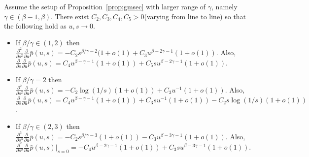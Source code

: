 \documentclass[10pt,a4paper]{amsart}
\begin{document}
\begin{lemma}\label{lemma:doubderder} Assume the setup of Proposition~\ref{prop:gmsec} with larger range of $\gamma$,
namely $\gamma\in (\beta-1,\beta)$. There exist $C_2, C_3, C_4, C_5>0$(varying from line to line) so that the following hold as $u,s\to 0$.
\begin{itemize}
\item[(i)] If $\beta/\gamma\in (1,2)$ then 
\(
\frac{\partial^2}{\partial s^2}\frac{\partial}{\partial u}\bar p(u,s)=-C_2s^{\beta/\gamma-2}(1+o(1)+C_3 u^{\beta-2\gamma-1}(1+o(1)).\)
Also, $\frac{\partial}{\partial s}\frac{\partial}{\partial u}\bar p(u,s)= C_4u^{\beta-\gamma-1}(1+o(1))+C_5 s u^{\beta-2\gamma-1}(1+o(1))$.


\item[(ii)] If $\beta/\gamma=2$ then 
\(
\frac{\partial^2}{\partial s^2}\frac{\partial}{\partial u}\bar p(u,s)=-C_2\log(1/s)(1+o(1))+C_3 u^{-1}(1+o(1)).\)
Also, $\frac{\partial}{\partial s}\frac{\partial}{\partial u}\bar p(u,s)= C_4u^{\beta-\gamma-1}(1+o(1))+ C_3s u^{-1}(1+o(1))-C_2 s\log(1/s)(1+o(1))$.
\item[(ii)] If $\beta/\gamma\in (2,3)$ then 
\(
\frac{\partial^3}{\partial s^3}\frac{\partial}{\partial u}\bar p(u,s)=-C_2s^{\beta/\gamma-3}(1+o(1))-C_3 u^{\beta-3\gamma-1}(1+o(1)).\)
Also, $\frac{\partial^2}{\partial s^2}\frac{\partial}{\partial u}\bar p(u,s)\Big|_{s=0}=- C_4u^{\beta-2\gamma-1}(1+o(1))+C_3 s u^{\beta-3\gamma-1}(1+o(1))$.
\end{itemize}

\end{lemma}
\end{document}
